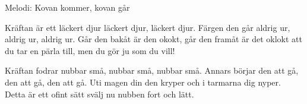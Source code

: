 \begin{song}


\begin{songmeta}
Melodi: Kovan kommer, kovan går
\end{songmeta}

\begin{songtext}
Kräftan är ett läckert djur
läckert djur, läckert djur.
Färgen den går aldrig ur,
aldrig ur, aldrig ur.
Går den bakåt är den okokt,
går den framåt är det oklokt
att du tar en pärla till,
men du gör ju som du vill!

Kräftan fodrar nubbar små,
nubbar små, nubbar små.
Annars börjar den att gå,
den att gå, den att gå.
Uti magen din den kryper
och i tarmarna dig nyper.
Detta är ett ofint sätt
svälj nu nubben fort och lätt.
\end{songtext}

\end{song}
